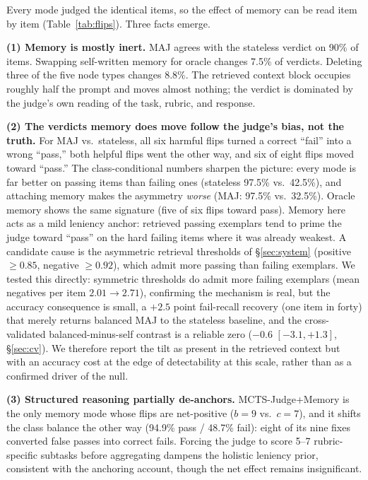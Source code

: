 \documentclass[]{ceurart}
\begin{document}
Every mode judged the identical items, so the effect of memory can be read item by item (Table~\ref{tab:flips}). Three facts emerge.

\textbf{(1) Memory is mostly inert.} MAJ agrees with the stateless verdict on 90\% of items. Swapping self-written memory for oracle changes 7.5\% of verdicts. Deleting three of the five node types changes 8.8\%. The retrieved context block occupies roughly half the prompt and moves almost nothing; the verdict is dominated by the judge's own reading of the task, rubric, and response.

\textbf{(2) The verdicts memory does move follow the judge's bias, not the truth.} For MAJ vs.\ stateless, all six harmful flips turned a correct ``fail'' into a wrong ``pass,'' both helpful flips went the other way, and six of eight flips moved toward ``pass.'' The class-conditional numbers sharpen the picture: every mode is far better on passing items than failing ones (stateless 97.5\% vs.\ 42.5\%), and attaching memory makes the asymmetry \emph{worse} (MAJ: 97.5\% vs.\ 32.5\%). Oracle memory shows the same signature (five of six flips toward pass). Memory here acts as a mild leniency anchor: retrieved passing exemplars tend to prime the judge toward ``pass'' on the hard failing items where it was already weakest. A candidate cause is the asymmetric retrieval thresholds of \S\ref{sec:system} (positive $\ge 0.85$, negative $\ge 0.92$), which admit more passing than failing exemplars. We tested this directly: symmetric thresholds do admit more failing exemplars (mean negatives per item $2.01\to2.71$), confirming the mechanism is real, but the accuracy consequence is small, a $+2.5$ point fail-recall recovery (one item in forty) that merely returns balanced MAJ to the stateless baseline, and the cross-validated balanced-minus-self contrast is a reliable zero ($-0.6$ $[-3.1, +1.3]$, \S\ref{sec:cv}). We therefore report the tilt as present in the retrieved context but with an accuracy cost at the edge of detectability at this scale, rather than as a confirmed driver of the null.

\textbf{(3) Structured reasoning partially de-anchors.} MCTS-Judge+Memory is the only memory mode whose flips are net-positive ($b{=}9$ vs.\ $c{=}7$), and it shifts the class balance the other way (94.9\% pass / 48.7\% fail): eight of its nine fixes converted false passes into correct fails. Forcing the judge to score 5--7 rubric-specific subtasks before aggregating dampens the holistic leniency prior, consistent with the anchoring account, though the net effect remains insignificant.
\end{document}
